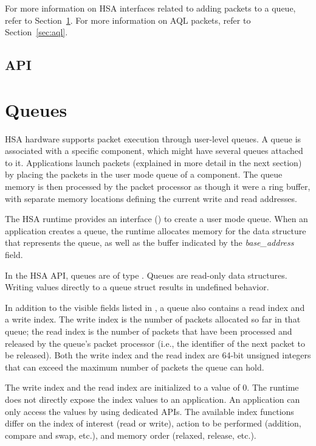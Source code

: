 \documentclass[final]{book}
\newcommand{\reffld}[1]{\textit{#1}}
\begin{document}
For more information on HSA interfaces related to adding packets to a queue,
refer to Section~\ref{sec:queues}. For more information on AQL packets, refer
to Section~\ref{sec:aql}.



\subsection{API}


\section{Queues} \label{sec:queues}

HSA hardware supports packet execution through user-level queues. A queue is
associated with a specific component, which might have several queues attached
to it. Applications launch packets (explained in more detail in the next
section) by placing the packets in the user mode queue of a component. The queue
memory is then processed by the packet processor as though it were a ring buffer,
with separate memory locations defining the current write and read addresses.

The HSA runtime provides an interface () to create a
user mode queue. When an application creates a queue, the runtime allocates
memory for the data structure that represents the queue, as well as the buffer
indicated by the \reffld{base_address} field.

In the HSA API, queues are of type . Queues are read-only
data structures. Writing values directly to a queue struct results in
undefined behavior.

In addition to the visible fields listed in , a queue also
contains a read index and a write index. The write index is the number of
packets allocated so far in that queue; the read index is the number of packets
that have been processed and released by the queue's packet processor (i.e., the
identifier of the next packet to be released). Both the write index and the read
index are 64-bit unsigned integers that can exceed the maximum number of
packets the queue can hold.

The write index and the read index are initialized to a value of 0. The runtime
does not directly expose the index values to an application. An application can
only access the values by using dedicated APIs.  The available index functions
differ on the index of interest (read or write), action to be performed
(addition, compare and swap, etc.), and memory order (relaxed, release, etc.).
\end{document}
